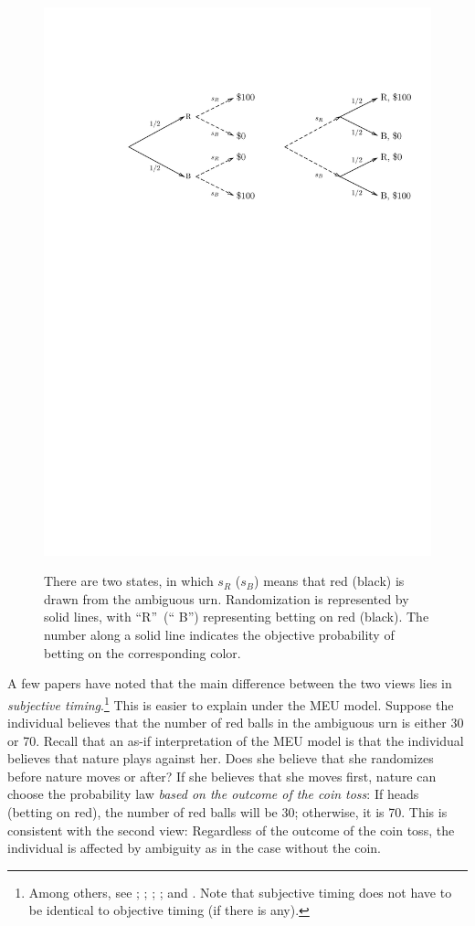 \documentclass[12pt, notitlepage]{article}
\begin{document}
\begin{figure}[h!]
  \centering   \label{fig_eaep_intro}
    \includegraphics{img/eaep.pdf}
    \caption{There are
two states, in which $s_{R}$ ($s_{B}$) means that red (black) is drawn from
the ambiguous urn. Randomization is represented by solid lines, with
\textquotedblleft R\textquotedblright\ (\textquotedblleft
B\textquotedblright ) representing betting on red (black). The number along
a solid line indicates the objective probability of betting on the
corresponding color.}
\end{figure}


A few papers have noted that the main difference between the two views lies
in \textit{subjective timing}.\footnote{%
Among others, see \cite{EpsteinMarinacciSeo07}; \cite{Bade15}; \cite%
{BaillonHalevyLi15}; \cite{Saito15}; and \cite{OechsslerRauRoomets19}. Note
that subjective timing does not have to be identical to objective timing (if
there is any).} This is easier to explain under the MEU model. Suppose the
individual believes that the number of red balls in the ambiguous urn is
either 30 or 70. Recall that an as-if interpretation of the MEU model is
that the individual believes that nature plays against her. Does she believe
that she randomizes before nature moves or after? If she believes that she
moves first, nature can choose the probability law \textit{based on the
outcome of the coin toss}: If heads (betting on red), the number of red
balls will be 30; otherwise, it is 70. This is consistent with the second
view: Regardless of the outcome of the coin toss, the individual is affected
by ambiguity as in the case without the coin.
\end{document}

